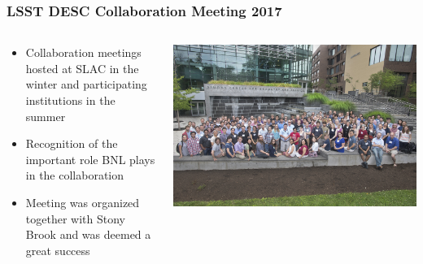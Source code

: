 \documentclass{beamer}
\begin{document}
\begin{frame}
  \frametitle{LSST DESC Collaboration Meeting 2017 }
  
  \begin{columns}
    \begin{column}{5cm}
      \begin{itemize}
      \item Collaboration meetings hosted at SLAC in the winter and
        participating institutions in the summer
      \item Recognition of the important role BNL plays in the
        collaboration
      \item Meeting was organized together with Stony Brook and was
        deemed a great success

      \end{itemize}
    \end{column}
    \begin{column}{6cm}
      \includegraphics[width=\linewidth]{./D0680717.jpg}
    \end{column}
  \end{columns}


\end{frame}
\end{document}

